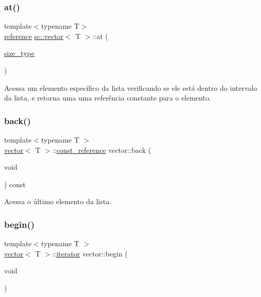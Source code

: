 \mbox{\label{classsc_1_1vector_ae3f1a60bf1dac7bdf96b78e708d6e2ca}} 
\subsubsection{\texorpdfstring{at()}{at()}\hspace{0.1cm}{\footnotesize\ttfamily [2/2]}}
{\footnotesize\ttfamily template$<$typename T$>$ \\
\hyperlink{classsc_1_1vector_a37394c8a6b82c4a0709737d7982e32b2}{reference} \hyperlink{classsc_1_1vector}{sc\+::vector}$<$ T $>$\+::at (\begin{DoxyParamCaption}\item[{\hyperlink{classsc_1_1vector_a48bf37ba1a6d0c13504414d86e27c399}{size\+\_\+type}}]{ }\end{DoxyParamCaption})}



Acessa um elemento específico da lista verificando se ele está dentro do intervalo da lista, e retorna uma uma referência constante para o elemento. 

\mbox{\label{classsc_1_1vector_a3b924e6f20777a29ef818a1805c7b357}} 
\subsubsection{\texorpdfstring{back()}{back()}}
{\footnotesize\ttfamily template$<$typename T $>$ \\
\hyperlink{classsc_1_1vector}{vector}$<$ T $>$\+::\hyperlink{classsc_1_1vector_a8da2b1a11b069241100f9b2e14f481a0}{const\+\_\+reference} vector\+::back (\begin{DoxyParamCaption}\item[{void}]{ }\end{DoxyParamCaption}) const}



Acessa o último elemento da lista. 

\mbox{\label{classsc_1_1vector_ae198130cd01e8d5a4df07d6567b51eb4}} 
\subsubsection{\texorpdfstring{begin()}{begin()}}
{\footnotesize\ttfamily template$<$typename T $>$ \\
\hyperlink{classsc_1_1vector}{vector}$<$ T $>$\+::\hyperlink{classsc_1_1vector_a9e5d5cc35e379aa27a93989f4a71413c}{iterator} vector\+::begin (\begin{DoxyParamCaption}\item[{void}]{ }\end{DoxyParamCaption})}



